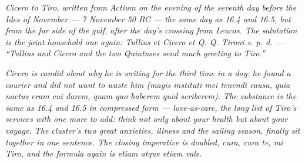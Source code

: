 
\textit{Cicero to Tiro, written from Actium on the evening of
the seventh day before the Ides of November --- 7 November 50
BC --- the same day as 16.4 and 16.5, but from the far side of
the gulf, after the day's crossing from Leucas. The salutation
is the joint household one again: \textit{Tullius et Cicero et
Q. Q. Tironi s. p. d.} --- ``Tullius and Cicero and the two
Quintuses send much greeting to Tiro.''}

\textit{Cicero is candid about why he is writing for the third
time in a day: he found a courier and did not want to waste him
(\textit{magis instituti mei tenendi causa, quia nactus eram
cui darem, quam quo haberem quid scriberem}). The substance is
the same as 16.4 and 16.5 in compressed form --- love-as-care,
the long list of Tiro's services with one more to add: think
not only about your health but about your voyage. The cluster's
two great anxieties, illness and the sailing season, finally
sit together in one sentence. The closing imperative is
doubled, \textit{cura, cura te, mi Tiro}, and the formula again
is \textit{etiam atque etiam vale}.}
